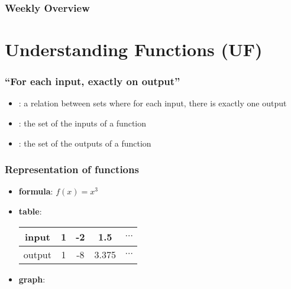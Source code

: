\documentclass[10pt,t,presentation,ignorenonframetext,aspectratio=169]{beamer}
\title[\course]{\lecTitle}
\institute[Ohio State]
{
  \medskip
}
\date[\week]{\semester}
\author{Tae Eun Kim, Ph.D.}
\begin{document}
\begin{frame}
  \titlepage
\end{frame}

\begin{frame}
  \frametitle{Weekly Overview}
  \tableofcontents
\end{frame}

\section{Understanding Functions (UF)}
\label{sec:underst-funct-uf}
\begin{frame}
  \frametitle{``For each input, exactly on output''}
  \begin{definition}
    \begin{itemize}
    \item {}: a relation between sets where for each
      input, there is exactly one output
    \item {}: the set of the inputs of a function
    \item {}: the set of the outputs of a function
    \end{itemize}
  \end{definition}
\end{frame}

\begin{frame}
  \frametitle{Representation of functions}
  \begin{itemize}
  \item \textbf{formula}: $f(x) = x^3$
  \item \textbf{table}: \\
    \begin{center}
      \begin{tabular}{c|c|c|c|c}
        input & 1 & -2 & 1.5 & $\cdots$ \\ \hline
        output & 1 & -8 & 3.375 & $\cdots$
      \end{tabular}
    \end{center}
  \item \textbf{graph}: \\
    \begin{center}
    \end{center}
  \end{itemize}
\end{frame}
\end{document}
